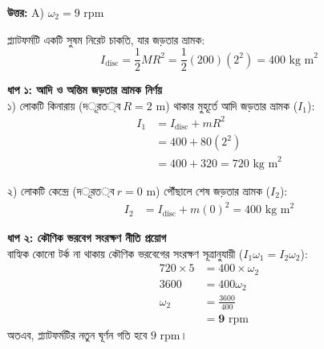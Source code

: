 \documentclass[12pt, a4paper]{article}
\begin{document}
\vspace{0.5em}
\begin{tcolorbox}[answerbox]
\textbf{\color{success} উত্তর:} A)  $\omega_2 = 9\text{ rpm}$
\end{tcolorbox}
\vspace{1em}

\begin{tcolorbox}[solutionbox={সমাধান (Solution)}]
\noindent
প্ল্যাটফর্মটি একটি সুষম নিরেট চাকতি, যার জড়তার ভ্রামক:
\[I_{\text{disc}} = \frac{1}{2} M R^2 = \frac{1}{2} (200) (2^2) = 400\text{ kg m}^2\]

\textbf{ধাপ ১: আদি ও অন্তিম জড়তার ভ্রামক নির্ণয়} \\
১) লোকটি কিনারায় ($দূরত্ব\ R = 2\text{ m}$) থাকার মুহূর্তে আদি জড়তার ভ্রামক ($I_1$):
\begin{align*}
    I_1 &= I_{\text{disc}} + m R^2 \\
        &= 400 + 80 (2^2) \\
        &= 400 + 320 = 720\text{ kg m}^2
\end{align*}

২) লোকটি কেন্দ্রে ($দূরত্ব\ r = 0\text{ m}$) পৌঁছালে শেষ জড়তার ভ্রামক ($I_2$):
\begin{align*}
    I_2 &= I_{\text{disc}} + m (0)^2 = 400\text{ kg m}^2
\end{align*}

\vspace{0.5em}
\textbf{ধাপ ২: কৌণিক ভরবেগ সংরক্ষণ নীতি প্রয়োগ} \\
বাহ্যিক কোনো টর্ক না থাকায় কৌণিক ভরবেগের সংরক্ষণ সূত্রানুযায়ী ($I_1 \omega_1 = I_2 \omega_2$):
\begin{align*}
    720 \times 5 &= 400 \times \omega_2 \\
    3600 &= 400 \omega_2 \\
    \omega_2 &= \frac{3600}{400} \\
    &= \mathbf{9}\text{ rpm}
\end{align*}
অতএব, প্ল্যাটফর্মটির নতুন ঘূর্ণন গতি হবে $9\text{ rpm}$।
\end{tcolorbox}
\end{document}
